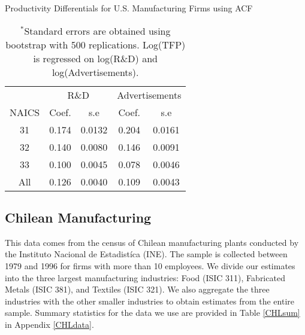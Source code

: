 \documentclass[12pt]{article}
\begin{document}
\begin{table}[H]
\centering
\caption{Productivity Differentials for U.S. Manufacturing Firms using ACF}
\small
\begin{tabular}{ccccc}
  \hline\hline & \multicolumn{2}{c}{R\&D}  & \multicolumn{2}{c}{Advertisements} \\ \cmidrule(lr){2-3} \cmidrule(lr){4-5}NAICS & Coef. & s.e & Coef. & s.e \\ 
  \hline
31 & 0.174 & 0.0132 & 0.204 & 0.0161 \\ 
  32 & 0.140 & 0.0080 & 0.146 & 0.0091 \\ 
  33 & 0.100 & 0.0045 & 0.078 & 0.0046 \\ 
  All & 0.126 & 0.0040 & 0.109 & 0.0043 \\ 
   \hline
\end{tabular}
\caption*{\footnotesize $^{*}$Standard errors are obtained using bootstrap with 500 replications. Log(TFP) is regressed on log(R\&D) and log(Advertisements).}
\label{ACFUSTFPP}
\end{table}

\subsection{Chilean Manufacturing}
This data comes from the census of Chilean manufacturing plants conducted by the Instituto Nacional de Estadist\'ica (INE). The sample is collected between 1979 and 1996 for firms with more than 10 employees. We divide our estimates into the three largest manufacturing industries: Food (ISIC 311), Fabricated Metals (ISIC 381), and Textiles (ISIC 321). We also aggregate the three industries with the other smaller industries to obtain estimates from the entire sample. Summary statistics for the data we use are provided in Table \ref{CHLsum} in Appendix \ref{CHLdata}.
\end{document}
